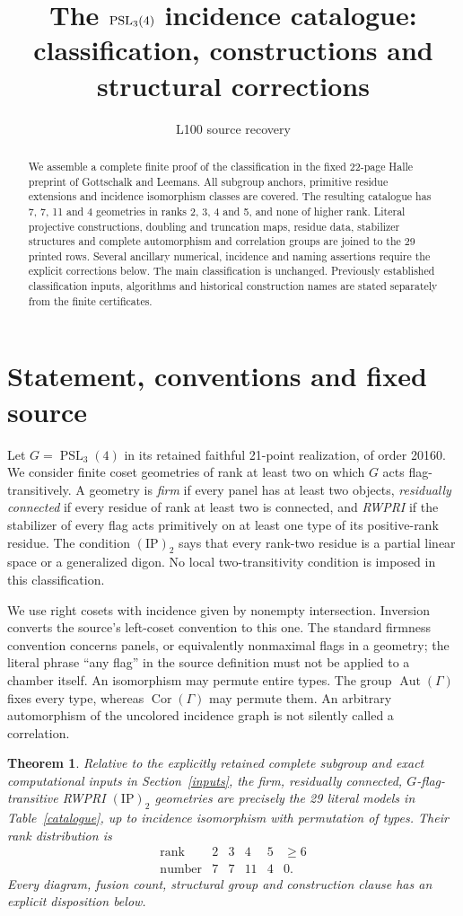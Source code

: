 \documentclass[11pt]{article}
\title{The $\PSL_3(4)$ incidence catalogue: classification, constructions and structural corrections}
\author{L100 source recovery}\date{}
\newtheorem{theorem}{Theorem}\newtheorem{proposition}[theorem]{Proposition}
\newcommand{\Aut}{\operatorname{Aut}}\newcommand{\Cor}{\operatorname{Cor}}
\newcommand{\PSL}{\operatorname{PSL}}\newcommand{\PG}{\operatorname{PG}}
\newcommand{\ip}{\mathrm{(IP)}_2}
\begin{document}
\maketitle
\begin{abstract}
We assemble a complete finite proof of the classification in the fixed
22-page Halle preprint of Gottschalk and Leemans. All subgroup anchors,
primitive residue extensions and incidence isomorphism classes are covered.
The resulting catalogue has 7, 7, 11 and 4 geometries in ranks 2, 3, 4 and 5,
and none of higher rank. Literal projective constructions, doubling and
truncation maps, residue data, stabilizer structures and complete
automorphism and correlation groups are joined to the 29 printed rows.
Several ancillary numerical, incidence and naming assertions require
the explicit corrections below. The main classification is unchanged.
Previously established classification inputs, algorithms and historical
construction names are stated separately from the finite certificates.
\end{abstract}

\section{Statement, conventions and fixed source}
Let $G=\PSL_3(4)$ in its retained faithful 21-point realization, of order
20160. We consider finite coset geometries of rank at least two on which
$G$ acts flag-transitively. A geometry is \emph{firm} if every panel has
at least two objects, \emph{residually connected} if every residue of
rank at least two is connected, and \emph{RWPRI} if the stabilizer of
every flag acts primitively on at least one type of its positive-rank
residue. The condition $\ip$ says that every rank-two residue is a
partial linear space or a generalized digon. No local two-transitivity
condition is imposed in this classification.

We use right cosets with incidence given by nonempty intersection.
Inversion converts the source's left-coset convention to this one.
The standard firmness convention concerns panels, or equivalently
nonmaximal flags in a geometry; the literal phrase ``any flag'' in the
source definition must not be applied to a chamber itself. An isomorphism
may permute entire types. The group $\Aut(\Gamma)$ fixes every type,
whereas $\Cor(\Gamma)$ may permute them. An arbitrary automorphism of
the uncolored incidence graph is not silently called a correlation.

\begin{theorem}\label{main}
Relative to the explicitly retained complete subgroup and exact
computational inputs in Section~\ref{inputs}, the firm, residually
connected, $G$-flag-transitive RWPRI $\ip$ geometries are precisely the
29 literal models in Table~\ref{catalogue}, up to incidence isomorphism
with permutation of types. Their rank distribution is
\[
\begin{array}{c|rrrrr}
\text{rank}&2&3&4&5&\geq6\\\hline
\text{number}&7&7&11&4&0.
\end{array}
\]
Every diagram, fusion count, structural group and construction clause
has an explicit disposition below.
\end{theorem}
\end{document}
